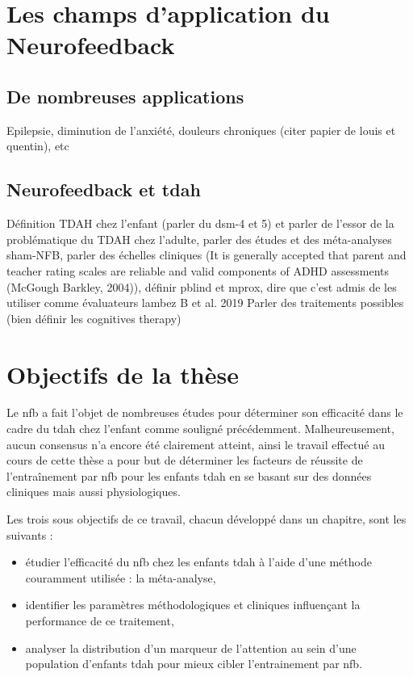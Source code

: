 \section{Les champs d'application du Neurofeedback} \label{applications_NFB}

\subsection{De nombreuses applications}
Epilepsie, diminution de l’anxiété, douleurs chroniques (citer papier de louis et quentin), etc

\subsection{Neurofeedback et \gls{tdah}}
Définition TDAH chez l’enfant (parler du dsm-4 et 5) et parler de l’essor de la problématique du TDAH chez l’adulte, parler des études et des méta-analyses
sham-NFB, parler des échelles cliniques (It is generally accepted that parent and teacher rating scales are reliable and 
valid components of ADHD assessments (McGough  Barkley, 2004)), définir pblind et mprox, dire que c'est admis de les utiliser comme évaluateurs lambez B et al. 2019
Parler des traitements possibles (bien définir les cognitives therapy)

\section{Objectifs de la thèse}
Le \gls{nfb} a fait l'objet de nombreuses études pour déterminer son efficacité dans le cadre du \gls{tdah} chez l'enfant comme souligné précédemment.
Malheureusement, aucun consensus n'a encore été clairement atteint, ainsi le travail effectué au cours de cette thèse a pour but de déterminer les facteurs 
de réussite de l'entraînement par \gls{nfb} pour les enfants \gls{tdah} en se basant sur des données cliniques mais aussi physiologiques. 

Les trois sous objectifs de ce travail, chacun développé dans un chapitre, sont les suivants :
\renewcommand{\labelitemi}{$\bullet$}
\renewcommand{\labelitemii}{$\cdot$}
\begin{itemize}
\item étudier l'efficacité du \gls{nfb} chez les enfants \gls{tdah} à l'aide d'une méthode couramment utilisée : la méta-analyse,
\item identifier les paramètres méthodologiques et cliniques influençant la performance de ce traitement,
\item analyser la distribution d'un marqueur de l'attention au sein d'une population d'enfants \gls{tdah} pour mieux cibler
l'entrainement par \gls{nfb}. 
\end{itemize}

